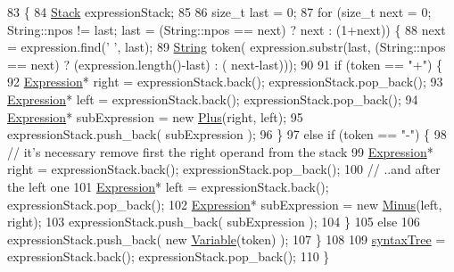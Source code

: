 \begin{DoxyCode}
83                                 \{
84         \hyperlink{namespacewikibooks__design__patterns_a3247979de240b19de03793d4ec6ede0e}{Stack} expressionStack;
85 
86     \textcolor{keywordtype}{size\_t} last = 0;
87     \textcolor{keywordflow}{for} (\textcolor{keywordtype}{size\_t} next = 0; String::npos != last; last = (String::npos == next) ? next : (1+next)) \{
88         next = expression.find(\textcolor{charliteral}{' '}, last);
89         \hyperlink{namespacewikibooks__design__patterns_a603d2591ea56686888d0e4389481a453}{String} token( expression.substr(last, (String::npos == next) ? (expression.length()-last) : (
      next-last)));
90 
91             \textcolor{keywordflow}{if}  (token == \textcolor{stringliteral}{"+"}) \{
92         \hyperlink{structwikibooks__design__patterns_1_1Expression}{Expression}* right = expressionStack.back(); expressionStack.pop\_back();
93                 \hyperlink{structwikibooks__design__patterns_1_1Expression}{Expression}* left = expressionStack.back(); expressionStack.pop\_back();
94                 \hyperlink{structwikibooks__design__patterns_1_1Expression}{Expression}* subExpression = \textcolor{keyword}{new} \hyperlink{classwikibooks__design__patterns_1_1Plus}{Plus}(right, left);
95                 expressionStack.push\_back( subExpression );
96             \}
97             \textcolor{keywordflow}{else} \textcolor{keywordflow}{if} (token == \textcolor{stringliteral}{"-"}) \{
98                 \textcolor{comment}{// it's necessary remove first the right operand from the stack}
99                 \hyperlink{structwikibooks__design__patterns_1_1Expression}{Expression}* right = expressionStack.back(); expressionStack.pop\_back();
100                 \textcolor{comment}{// ..and after the left one}
101                 \hyperlink{structwikibooks__design__patterns_1_1Expression}{Expression}* left = expressionStack.back(); expressionStack.pop\_back();
102                 \hyperlink{structwikibooks__design__patterns_1_1Expression}{Expression}* subExpression = \textcolor{keyword}{new} \hyperlink{classwikibooks__design__patterns_1_1Minus}{Minus}(left, right);
103                 expressionStack.push\_back( subExpression );
104             \}
105             \textcolor{keywordflow}{else}                        
106                 expressionStack.push\_back( \textcolor{keyword}{new} \hyperlink{classwikibooks__design__patterns_1_1Variable}{Variable}(token) );
107         \}
108 
109         \hyperlink{classwikibooks__design__patterns_1_1Evaluator_a22439cc7dc84a90b755c2955c8c4ac74}{syntaxTree} = expressionStack.back(); expressionStack.pop\_back();
110     \}
\end{DoxyCode}
